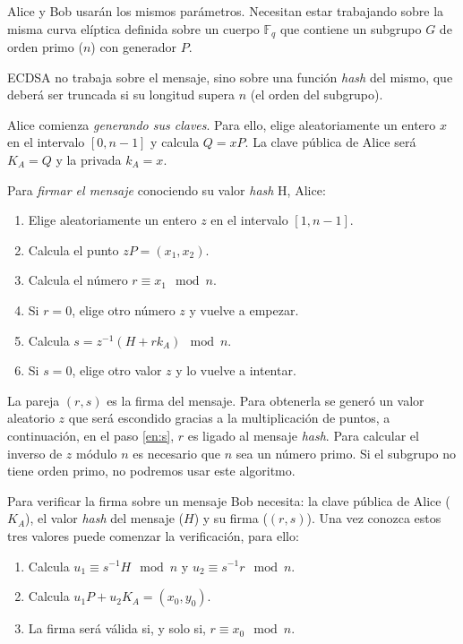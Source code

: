 \documentclass[
  a4paper,
  12pt,
  spanish,
]{scrartcl}
\begin{document}
Alice y Bob usarán los mismos parámetros. Necesitan estar trabajando sobre la misma curva elíptica definida sobre un cuerpo $\mathbb{F}_q$ que contiene un subgrupo $G$ de orden primo ($n$) con generador $P$.

ECDSA no trabaja sobre el mensaje, sino sobre una función \textit{hash} del mismo, que deberá ser truncada si su longitud supera $n$ (el orden del subgrupo).

Alice comienza \textit{generando sus claves}. Para ello, elige aleatoriamente un entero $x$ en el intervalo $[0,n-1]$ y calcula $Q=xP$. La clave pública de Alice será $K_A=Q$ y la privada $k_A=x$.

Para \textit{firmar el mensaje} conociendo su valor \textit{hash} H, Alice:

\begin{enumerate}
\item Elige aleatoriamente un entero $z$ en el intervalo $[1,n-1]$.
\item Calcula el punto $zP =(x_1,x_2)$.
\item Calcula el número $r \equiv x_1 \mod n$.
\item Si $r=0$, elige otro número $z$ y vuelve a empezar.
\item Calcula $s=z^{-1}(H+rk_A)\mod n$. \label{en:s}
\item Si $s=0$, elige otro valor $z$ y lo vuelve a intentar.
\end{enumerate}

La pareja $(r, s)$ es la firma del mensaje. Para obtenerla se generó un valor aleatorio $z$ que será escondido gracias a la multiplicación de puntos, a continuación, en el paso \ref{en:s}, $r$ es ligado al mensaje \textit{hash}. Para calcular el inverso de $z$ módulo $n$ es necesario que $n$ sea un número primo. Si el subgrupo no tiene orden primo, no podremos usar este algoritmo.

Para verificar la firma sobre un mensaje Bob necesita: la clave pública de Alice ($K_A$), el valor \textit{hash} del mensaje ($H$) y su firma ($(r,s)$). Una vez conozca estos tres valores puede comenzar la verificación, para ello:

\begin{enumerate}
\item Calcula $u_1 \equiv s^{-1}H \mod n$ y $u_2 \equiv s^{-1}r \mod n$.
\item Calcula $u_1P + u_2 K_A = (x_0, y_0)$.
\item La firma será válida si, y solo si, $r \equiv x_0 \mod n$.
\end{enumerate}
\end{document}
